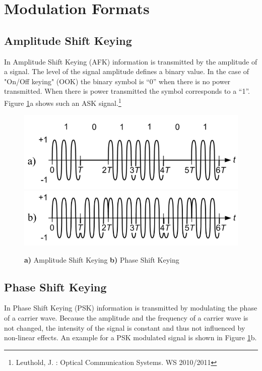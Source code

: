 \section{Modulation Formats}
% 



\subsection{Amplitude Shift Keying}
In Amplitude Shift Keying (AFK) information is transmitted by the amplitude of a signal. The level of the signal amplitude defines a binary value. In the case of "On/Off keying" (OOK) the binary symbol is "`0"' when there is no power transmitted. When there is power transmitted the symbol corresponds to a "`1"'. 
Figure \ref{fig:ask}a shows such an ASK signal.\footnote[1]{Leuthold, J. : Optical Communication Systems. WS 2010/2011}

\begin{figure}
  \centering
  \includegraphics[width=.5\columnwidth]{Grafiken/OOK.jpg}
	\includegraphics[width=.5\columnwidth]{Grafiken/PSK.jpg}%
\caption{\textbf{a)} Amplitude Shift Keying \textbf{b)} Phase Shift Keying}
\label{fig:ask}
\end{figure}

\subsection{Phase Shift Keying}
In Phase Shift Keying (PSK) information is transmitted by modulating the phase of a carrier wave. Because the amplitude and the frequency of a carrier wave is not changed, the intensity of the signal is constant and thus not influenced by non-linear effects. An example for a PSK modulated signal is shown in Figure \ref{fig:ask}b.\footnotemark[1]

